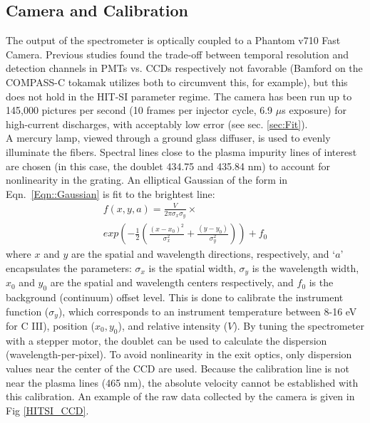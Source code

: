 \subsection{Camera and Calibration}
\hspace*{4ex}The output of the spectrometer is optically coupled to a Phantom v710 Fast Camera. Previous studies found the trade-off between temporal resolution and detection channels in PMTs vs. CCDs respectively not favorable (Bamford on the COMPASS-C tokamak \cite{bamford1992combination} utilizes both to circumvent this, for example), but this does not hold in the HIT-SI parameter regime. The camera has been run up to 145,000 pictures per second (10 frames per injector cycle, 6.9 $\mu$s exposure) for high-current discharges, with acceptably low error (see sec. \ref{sec:Fit}). \\
\hspace*{4ex} A mercury lamp, viewed through a ground glass diffuser, is used to evenly illuminate the fibers. Spectral lines close to the plasma impurity lines of interest are chosen (in this case, the doublet 434.75 and 435.84 nm) to account for nonlinearity in the grating. An elliptical Gaussian of the form in Eqn.~\ref{Eqn::Gaussian} is fit to the brightest line:
\begin{eqnarray}\label{Eqn::Gaussian}
f(x,y,a)=\frac{V}{2{\pi}\sigma_x\sigma_y}\times\nonumber\\ exp\left(-\frac{1}{2}\left(\frac{(x-x_0)^2}{\sigma_x^2}+\frac{(y-y_0)}{\sigma_y^2}\right)\right)+f_0
\end{eqnarray}
where $x$ and $y$ are the spatial and wavelength directions, respectively, and `$a$' encapsulates the parameters: ${\sigma}_x$ is the spatial width, ${\sigma}_y$ is the wavelength width, $x_0$ and $y_0$ are the spatial and wavelength centers respectively, and $f_0$ is the background (continuum) offset level. This is done to calibrate the instrument function ($\sigma_y$), which corresponds to an instrument temperature between 8-16 eV for C III), position ($x_0,y_0$), and relative intensity ($V$). By tuning the spectrometer with a stepper motor, the doublet can be used to calculate the dispersion (wavelength-per-pixel). To avoid nonlinearity in the exit optics, only dispersion values near the center of the CCD are used.  Because the calibration line is not near the plasma lines (465 nm), the absolute velocity cannot be established with this calibration. An example of the raw data collected by the camera is given in Fig \ref{HITSI_CCD}.
